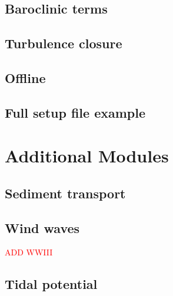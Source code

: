 \documentclass{report}
\begin{document}

	\section{Baroclinic terms}
	

	\section{Turbulence closure}
	

	\section{Offline}
	

	\section{Full setup file example}
	


\chapter{Additional Modules}

	\section{Sediment transport}
	

	\section{Wind waves}\textcolor{red}{ADD WWIII}
	

	\section{Tidal potential}
	
\end{document}
